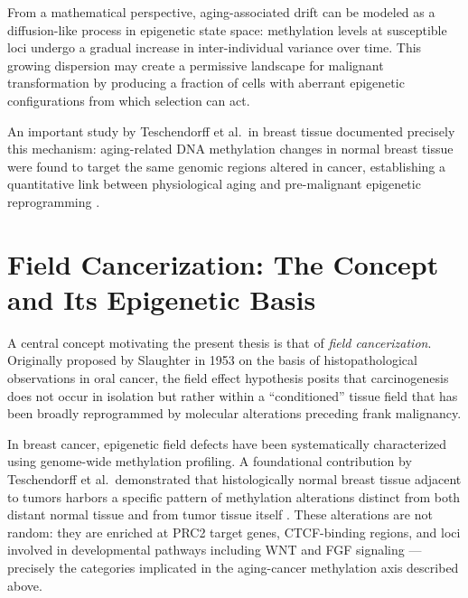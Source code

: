 From a mathematical perspective, aging-associated drift can be modeled as a
diffusion-like process in epigenetic state space: methylation levels at susceptible
loci undergo a gradual increase in inter-individual variance over time. This growing
dispersion may create a permissive landscape for malignant transformation by
producing a fraction of cells with aberrant epigenetic configurations from which
selection can act.

An important study by Teschendorff et al.\ in breast tissue documented precisely
this mechanism: aging-related DNA methylation changes in normal breast tissue
were found to target the same genomic regions altered in cancer, establishing a
quantitative link between physiological aging and pre-malignant epigenetic
reprogramming \cite{Teschendorff2019}.

\section{Field Cancerization: The Concept and Its Epigenetic Basis}

A central concept motivating the present thesis is that of \textit{field
cancerization}. Originally proposed by Slaughter in 1953 on the basis of
histopathological observations in oral cancer, the field effect hypothesis
posits that carcinogenesis does not occur in isolation but rather within
a ``conditioned'' tissue field that has been broadly reprogrammed by molecular
alterations preceding frank malignancy.

In breast cancer, epigenetic field defects have been systematically characterized
using genome-wide methylation profiling. A foundational contribution by
Teschendorff et al.\ demonstrated that histologically normal breast tissue adjacent
to tumors harbors a specific pattern of methylation alterations distinct from both
distant normal tissue and from tumor tissue itself \cite{Teschendorff2016}. These
alterations are not random: they are enriched at PRC2 target genes, CTCF-binding
regions, and loci involved in developmental pathways including WNT and FGF
signaling — precisely the categories implicated in the aging-cancer methylation axis
described above.

